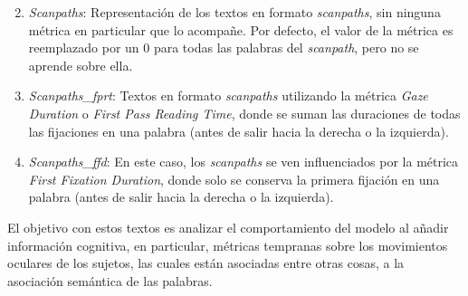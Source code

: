 \begin{enumerate}
    \setcounter{enumi}{1}
    \item \textit{Scanpaths}: Representación de los textos en formato \textit{scanpaths}, sin ninguna métrica en particular que lo acompañe. Por defecto, el valor de la métrica es reemplazado por un 0 para todas las palabras del \textit{scanpath}, pero no se aprende sobre ella.
    \item \textit{Scanpaths\_fprt}: Textos en formato \textit{scanpaths} utilizando la métrica \textit{Gaze Duration} o \textit{First Pass Reading Time}, donde se suman las duraciones de todas las fijaciones en una palabra (antes de salir hacia la derecha o la izquierda).
    \item \textit{Scanpaths\_ffd}: En este caso, los \textit{scanpaths} se ven influenciados por la métrica \textit{First Fixation Duration}, donde solo se conserva la primera fijación en una palabra (antes de salir hacia la derecha o la izquierda).
\end{enumerate}

El objetivo con estos textos es analizar el comportamiento del modelo al añadir información cognitiva, en particular, métricas tempranas sobre los movimientos oculares de los sujetos, las cuales están asociadas entre otras cosas, a la asociación semántica de las palabras.





